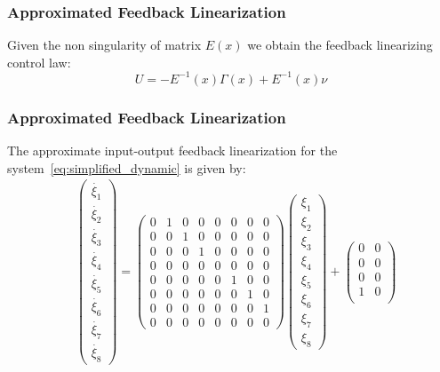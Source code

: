 %
\begin{frame}
\frametitle{Approximated Feedback Linearization}
Given the non singularity of matrix $E(x)$ we obtain the feedback linearizing control law:
\begin{equation}
	U = -E^{-1}(x)\Gamma(x) + E^{-1}(x)\nu
\end{equation}
\end{frame}
%
\begin{frame}
\frametitle{Approximated Feedback Linearization}
The approximate input-output feedback linearization for the system~\ref{eq:simplified_dynamic} is given by:
\begin{equation}
	\begin{aligned}
	 	&\begin{pmatrix}
	 	\dot{\xi_1} \\
	 	\dot{\xi_2} \\
	 	\dot{\xi_3} \\
	 	\dot{\xi_4} \\
	 	\dot{\xi_5} \\
	 	\dot{\xi_6} \\
	 	\dot{\xi_7} \\
	 	\dot{\xi_8}
	 	\end{pmatrix}=%
	 	\begin{pmatrix}
	 		0 &1 &0 &0 &0 &0 &0 &0 \\
	 		0 &0 &1 &0 &0 &0 &0 &0 \\
	 		0 &0 &0 &1 &0 &0 &0 &0 \\
	 		0 &0 &0 &0 &0 &0 &0 &0 \\
	 		0 &0 &0 &0 &0 &1 &0 &0 \\
	 		0 &0 &0 &0 &0 &0 &1 &0 \\
	 		0 &0 &0 &0 &0 &0 &0 &1 \\
	 		0 &0 &0 &0 &0 &0 &0 &0
	 	\end{pmatrix}%
	 	\begin{pmatrix}
	 		\xi_1 \\ \xi_2 \\ \xi_3 \\ \xi_4 \\ \xi_5 \\ \xi_6 \\ \xi_7 \\ \xi_8
	 	\end{pmatrix}+%
	 	\begin{pmatrix}
	 		0 &0 \\
	 		0 &0 \\
	 		0 &0 \\
	 		1 &0 \\

\end{pmatrix}
\end{aligned}
\end{equation}
\end{frame}
